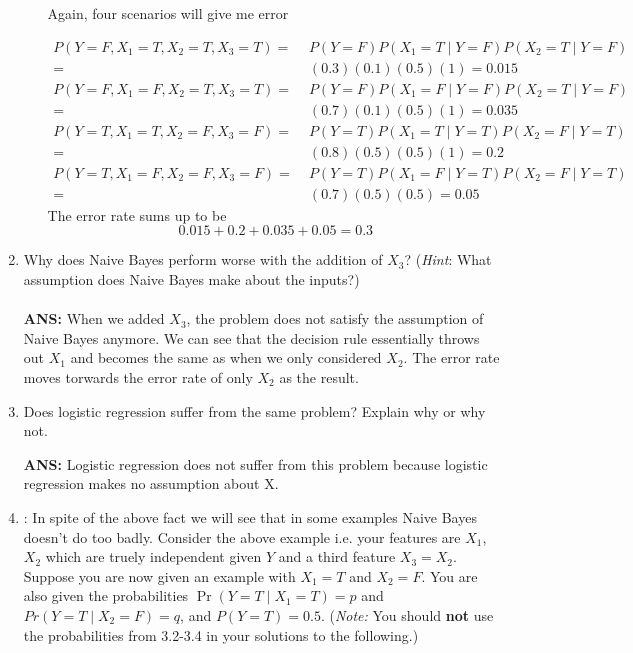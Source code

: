 \begin{enumerate}
\begin{enumerate}
Again, four scenarios will give me error

  \begin{align*}
  P(Y = F, X_1 = T, X_2 = T, X_3 = T) =&\; P(Y = F)P(X_1 = T \mid Y = F)P(X_2 = T \mid Y = F) \\
=&\; (0.3)(0.1)(0.5)(1) = 0.015\\
  P(Y = F, X_1 = F, X_2 = T, X_3 = T) =&\; P(Y = F)P(X_1 = F \mid Y = F)P(X_2 = T \mid Y = F) \\
=&\; (0.7)(0.1)(0.5)(1) = 0.035\\
  P(Y = T, X_1 = T, X_2 = F, X_3 = F) =&\; P(Y = T)P(X_1 = T \mid Y = T)P(X_2 = F \mid Y = T) \\
=&\; (0.8)(0.5)(0.5)(1) = 0.2\\
  P(Y = T, X_1 = F, X_2 = F, X_3 = F) =&\; P(Y = T)P(X_1 = F \mid Y = T)P(X_2 = F \mid Y = T) \\
=&\; (0.7)(0.5)(0.5) = 0.05
  \end{align*}
  The error rate sums up to be 
  \[
  0.015 + 0.2 + 0.035 + 0.05 = 0.3
  \]
    
  \end{enumerate}

\item Why does Naive Bayes perform worse with the addition
  of $X_3$?  (\emph{Hint}: What assumption does Naive Bayes make about
  the inputs?)
  \\
  \\{\bf ANS:}
  When we added $X_3$, the problem does not satisfy the assumption of Naive Bayes anymore. We can see that the decision rule essentially throws out $X_1$ and becomes the same as when we only considered $X_2$. The error rate moves torwards the error rate of only $X_2$ as the result.


\item Does logistic regression suffer from the same
  problem?  Explain why or why not.
  
{\bf ANS:}
  Logistic regression does not suffer from this problem because logistic regression makes no assumption about X.

\item : In spite of the above fact we
  will see that in some examples Naive Bayes doesn't do too
  badly. Consider the above example i.e. your features are $X_1$,
  $X_2$ which are truely independent given $Y$ and a third feature
  $X_3=X_2$.  Suppose you are now given an example with $X_1 = T$ and
  $X_2 = F$.  You are also given the probabilities $\Pr(Y=T \mid
  X_1=T)=p$ and $Pr(Y=T \mid X_2=F)=q$, and $P(Y=T) = 0.5$. (\emph{Note:} You should \textbf{not} use the probabilities from 3.2-3.4 in your solutions to the following.)


\end{enumerate}
